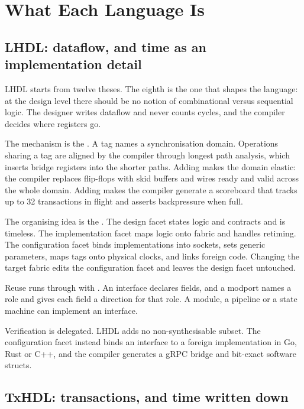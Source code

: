 \section{What Each Language Is}
\label{sec:two-languages}

\subsection{LHDL: dataflow, and time as an implementation detail}

LHDL starts from twelve theses. The eighth is the one that shapes the
language: at the design level there should be no notion of combinational
versus sequential logic. The designer writes dataflow and never counts
cycles, and the compiler decides where registers go.

The mechanism is the . A tag names a synchronisation domain.
Operations sharing a tag are aligned by the compiler through longest path
analysis, which inserts bridge registers into the shorter paths. Adding
 makes the domain elastic: the compiler replaces
flip-flops with skid buffers and wires ready and valid across the whole
domain. Adding  makes the compiler generate a scoreboard
that tracks up to 32 transactions in flight and asserts backpressure when
full.

The organising idea is the . The design facet states
logic and contracts and is timeless. The implementation facet maps logic
onto fabric and handles retiming. The configuration facet binds
implementations into sockets, sets generic parameters, maps tags onto
physical clocks, and links foreign code. Changing the target fabric edits
the configuration facet and leaves the design facet untouched.

Reuse runs through  with . An interface
declares fields, and a modport names a role and gives each field a direction
for that role. A module, a pipeline or a state machine can implement an
interface.

Verification is delegated. LHDL adds no non-synthesisable subset. The
configuration facet instead binds an interface to a foreign implementation
in Go, Rust or C++, and the compiler generates a gRPC bridge and bit-exact
software structs.

\subsection{TxHDL: transactions, and time written down}

